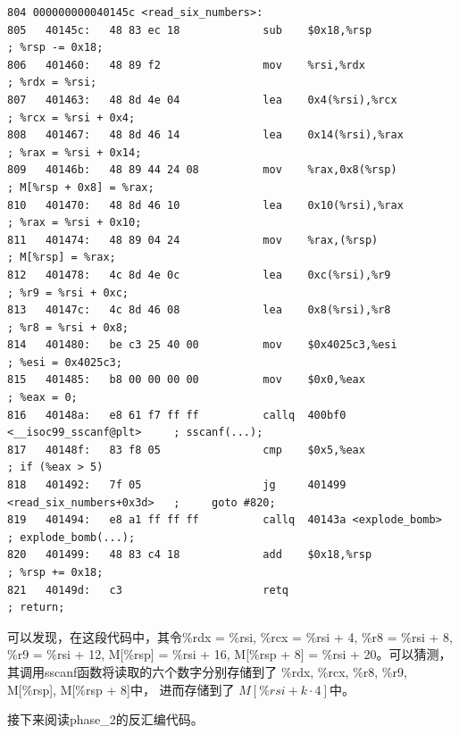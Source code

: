 \documentclass{article}
\begin{document}
\begin{lstlisting}[title = read\_six\_numbers反汇编代码及注释, xleftmargin = 2em,xrightmargin = 2em, aboveskip = 1em, numbers = none, basicstyle=\footnotesize\ttfamily]
804 000000000040145c <read_six_numbers>:
805   40145c:   48 83 ec 18             sub    $0x18,%rsp                       ; %rsp -= 0x18;
806   401460:   48 89 f2                mov    %rsi,%rdx                        ; %rdx = %rsi;
807   401463:   48 8d 4e 04             lea    0x4(%rsi),%rcx                   ; %rcx = %rsi + 0x4;
808   401467:   48 8d 46 14             lea    0x14(%rsi),%rax                  ; %rax = %rsi + 0x14;
809   40146b:   48 89 44 24 08          mov    %rax,0x8(%rsp)                   ; M[%rsp + 0x8] = %rax;
810   401470:   48 8d 46 10             lea    0x10(%rsi),%rax                  ; %rax = %rsi + 0x10;
811   401474:   48 89 04 24             mov    %rax,(%rsp)                      ; M[%rsp] = %rax;
812   401478:   4c 8d 4e 0c             lea    0xc(%rsi),%r9                    ; %r9 = %rsi + 0xc;
813   40147c:   4c 8d 46 08             lea    0x8(%rsi),%r8                    ; %r8 = %rsi + 0x8;
814   401480:   be c3 25 40 00          mov    $0x4025c3,%esi                   ; %esi = 0x4025c3;
815   401485:   b8 00 00 00 00          mov    $0x0,%eax                        ; %eax = 0;
816   40148a:   e8 61 f7 ff ff          callq  400bf0 <__isoc99_sscanf@plt>     ; sscanf(...);
817   40148f:   83 f8 05                cmp    $0x5,%eax                        ; if (%eax > 5)
818   401492:   7f 05                   jg     401499 <read_six_numbers+0x3d>   ;     goto #820;
819   401494:   e8 a1 ff ff ff          callq  40143a <explode_bomb>            ; explode_bomb(...);
820   401499:   48 83 c4 18             add    $0x18,%rsp                       ; %rsp += 0x18;
821   40149d:   c3                      retq                                    ; return;
  \end{lstlisting}

可以发现，在这段代码中，其令\%rdx = \%rsi, \%rcx = \%rsi + 4, \%r8 = \%rsi + 8, \%r9 = \%rsi + 12, M[\%rsp] = \%rsi + 16, M[\%rsp + 8] = \%rsi + 20。可以猜测，其调用sscanf函数将读取的六个数字分别存储到了 \%rdx, \%rcx, \%r8, \%r9, M[\%rsp], M[\%rsp + 8]中， 进而存储到了 $M[\%rsi + k \cdot 4]$中。

接下来阅读phase\_2的反汇编代码。
\end{document}
